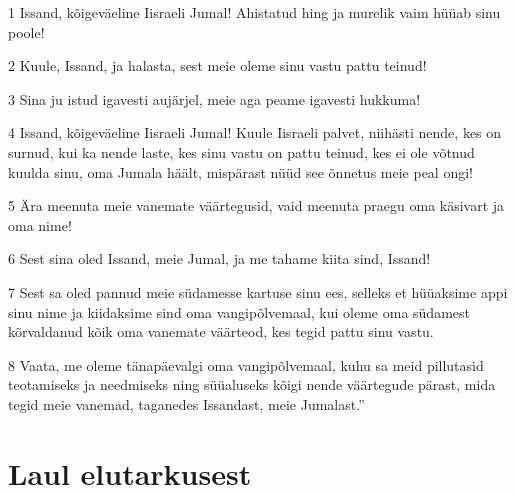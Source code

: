 \par 1 Issand, kõigeväeline Iisraeli Jumal! Ahistatud hing ja murelik vaim hüüab sinu poole!
\par 2 Kuule, Issand, ja halasta, sest meie oleme sinu vastu pattu teinud!
\par 3 Sina ju istud igavesti aujärjel, meie aga peame igavesti hukkuma!
\par 4 Issand, kõigeväeline Iisraeli Jumal! Kuule Iisraeli palvet, niihästi nende, kes on surnud, kui ka nende laste, kes sinu vastu on pattu teinud, kes ei ole võtnud kuulda sinu, oma Jumala häält, mispärast nüüd see õnnetus meie peal ongi!
\par 5 Ära meenuta meie vanemate väärtegusid, vaid meenuta praegu oma käsivart ja oma nime!
\par 6 Sest sina oled Issand, meie Jumal, ja me tahame kiita sind, Issand!
\par 7 Sest sa oled pannud meie südamesse kartuse sinu ees, selleks et hüüaksime appi sinu nime ja kiidaksime sind oma vangipõlvemaal, kui oleme oma südamest kõrvaldanud kõik oma vanemate väärteod, kes tegid pattu sinu vastu.
\par 8 Vaata, me oleme tänapäevalgi oma vangipõlvemaal, kuhu sa meid pillutasid teotamiseks ja needmiseks ning süüaluseks kõigi nende väärtegude pärast, mida tegid meie vanemad, taganedes Issandast, meie Jumalast.”

\section*{Laul elutarkusest}


